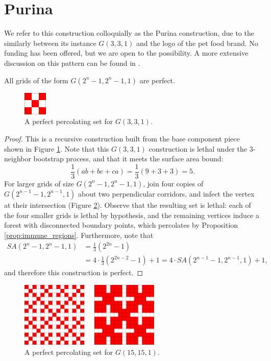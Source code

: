 \section{Purina}

We refer to this construction colloquially as the Purina construction, due to the similarly between its instance $G(3,3,1)$ and the logo of the pet food brand. No funding has been offered, but we are open to the possibility. A more extensive discussion on this pattern can be found in \cite{benevides:2021}.

\begin{con}
\label{con:purina}
All grids of the form $G(2^n-1, 2^n-1, 1)$ are perfect.
\end{con}

\begin{figure}[]
\centering
\includegraphics[width=0.1\textwidth]{figures/7/3x3x1.pdf}
\caption{A perfect percolating set for $G(3,3,1)$.}
\label{fig:3x3x1}
\end{figure} 

\begin{proof}
This is a recursive construction built from the base component piece shown in Figure \ref{fig:3x3x1}. Note that this $G(3,3,1)$ construction is lethal under the 3-neighbor bootstrap process, and that it meets the surface area bound:
$$\frac{1}{3} (ab+bc+ca) = \frac{1}{3} (9 + 3 + 3) = 5.$$
For larger grids of size $G(2^n-1, 2^n-1, 1)$, join four copies of $G(2^{n-1}-1, 2^{n-1}, 1)$ about two perpendicular corridors, and infect the vertex at their intersection (Figure \ref{fig:15x15x1}). Observe that the resulting set is lethal: each of the four smaller grids is lethal by hypothesis, and the remaining vertices induce a forest with disconnected boundary points, which percolates by Proposition \ref{prop:immune_regions}. Furthermore, note that
\begin{align*}
SA(2^n-1,2^n-1,1) &= \frac{1}{3} (2^{2n}-1) \\
&= 4 \cdot \frac{1}{3} (2^{2n-2} -1) + 1 = 4 \cdot SA(2^{n-1}-1, 2^{n-1}, 1) + 1,
\end{align*}
and therefore this construction is perfect.
\end{proof}

\begin{figure}[]
\centering
\includegraphics[width=0.6\textwidth]{figures/7/15x15x1.pdf}
\caption{A perfect percolating set for $G(15,15,1)$.}
\label{fig:15x15x1}
\end{figure} 

